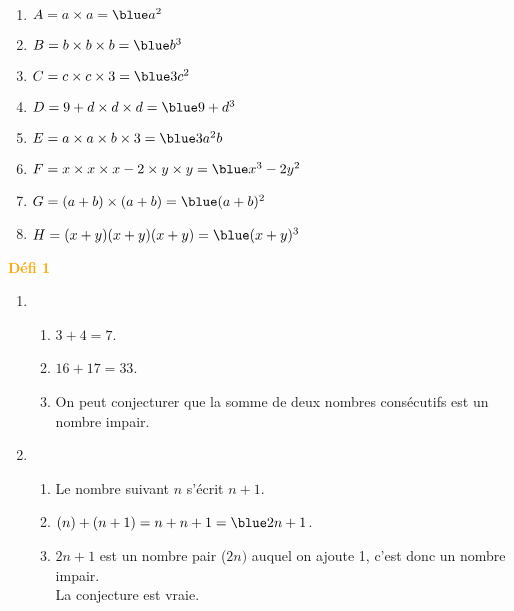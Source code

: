    \ \\ [-5mm]
   \begin{enumerate}
      \item $A =a\times a =\blue a^2$
      \item $B =b\times b\times b =\blue b^3$
      \item $C =c\times c\times3 =\blue3c^2$
      \item $D =9+d\times d\times d =\blue9+d^3$
      \item $E =a\times a\times b\times3 =\blue3a^2b$
      \item $F =x\times x\times x-2\times y\times y =\blue x^3-2y^2$
      \item $G =(a+b)\times(a+b) =\blue(a+b)^2$
      \item $H =(x+y)(x+y)(x+y) =\blue(x+y)^3$ \medskip
   \end{enumerate}

\bigskip
{}
\medskip

\hspace*{-7.5mm} \textcolor{orange}{\bf Défi 1} \\
   \begin{enumerate}
      \item
      \begin{enumerate}
         \item {\blue $3+4 =7$}.
         \item {\blue $16+17 =33$}.
         \item On peut conjecturer que  {\blue la somme de deux nombres consécutifs est un nombre impair}.
      \end{enumerate}
      \item
      \begin{enumerate}
         \item Le nombre suivant $n$ s'écrit {\blue $n+1$}.
         \item $(n)+(n+1) =n+n+1 ={\blue 2n+1}$.
         \item $2n+1$ est un nombre pair ($2n)$ auquel on ajoute 1, c'est donc un nombre impair. \\
            {\blue La conjecture est vraie}. \bigskip
      \end{enumerate}
   \end{enumerate}

